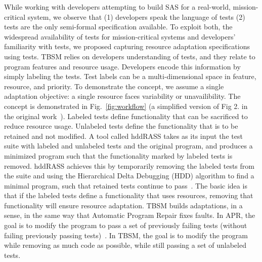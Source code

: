 While working with developers attempting to build SAS for a real-world, mission-critical system, we observe that (1) developers speak the language of tests (2) tests are the only semi-formal specification available. To exploit both, the widespread availability of tests for mission-critical systems and developers' familiarity with tests, we proposed capturing resource adaptation specifications using tests.
TBSM relies on developers understanding of tests, and they relate to program features and resource usage. Developers encode this information by simply labeling the tests. Test labels can be a multi-dimensional space in feature, resource, and priority. To demonstrate the concept, we assume a single adaptation objective: a single resource faces variability or unavailibility. The concept is demonstrated in Fig.~\ref{fig:workflow} (a simplified version of Fig 2. in the original work~\cite{christi2017saso}). Labeled tests define functionality that can be sacrificed to reduce resource usage. Unlabeled tests define the functionality that is to be retained and not modified. A tool called hddRASS takes as its input the test suite with labeled and unlabeled tests and the original program, and produces a minimized program such that the functionality marked by labeled tests is removed. hddRASS achieves this by temporarily removing the labeled tests from the suite and using the Hierarchical Delta Debugging (HDD) algorithm to find a minimal program, such that retained tests continue to pass~\cite{misherghi2006hdd}. The basic idea is that if the labeled tests define a functionality that uses resources, removing that functionality will ensure resource adaptation. TBSM builds adaptations, in a sense, in the same way that Automatic Program Repair fixes faults. In APR, the goal is to modify the program to pass a set of previously failing tests (without failing previously passing tests)~\cite{monperrus2018asr}. In TBSM, the goal is to modify the program while removing as much code as possible, while still passing a set of unlabeled tests.

